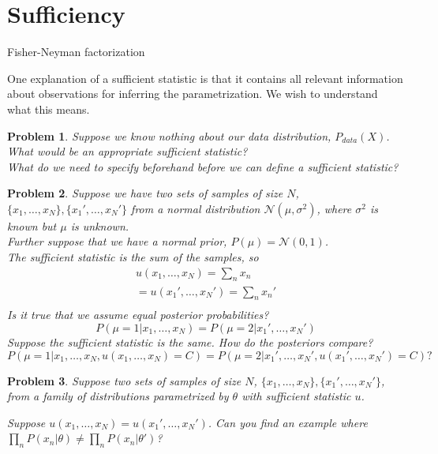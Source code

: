 \documentclass[a4paper]{article}
\newtheorem{problem}{Problem}[section]
\begin{document}
\section{Sufficiency}

Fisher-Neyman factorization

One explanation of a sufficient statistic is that it contains all relevant information about observations for inferring the parametrization.  We wish to understand what this means.

\begin{problem}
Suppose we know nothing about our data distribution, $P_{data}(X)$.  What would be an appropriate sufficient statistic?  \\
What do we need to specify beforehand before we can define a sufficient statistic?  
\end{problem}

\begin{problem}
  Suppose we have two sets of samples of size $N$, $\{x_1,\ldots,x_N\},\{x_1',\ldots,x_N'\}$ from a normal distribution $\mathcal{N}( \mu, \sigma^2 )$, where $\sigma^2$ is known but $\mu$ is unknown.  \\
  Further suppose that we have a normal prior, $P(\mu) = \mathcal{N}(0,1)$.  \\
  The sufficient statistic is the sum of the samples, so 
\begin{equation}
  \begin{split}
    u(x_1,\ldots,x_N) = \sum_n x_n \\
    = u(x_1',\ldots,x_N') = \sum_n x_n' \\
  \end{split}
  \label{}
\end{equation}
Is it true that we assume equal posterior probabilities?
\begin{equation}
  P( \mu = 1 \vert x_1,\ldots,x_N ) = P( \mu = 2 \vert x_1', \ldots, x_N')
  \label{}
\end{equation}
Suppose the sufficient statistic is the same.  How do the posteriors compare?
\begin{equation}
  P( \mu = 1 \vert x_1,\ldots,x_N, u(x_1,\ldots,x_N) = C ) = P( \mu = 2 \vert x_1',\ldots,x_N', u(x_1',\ldots,x_N') = C ) ?
  \label{}
\end{equation}

\end{problem}

\begin{problem}
Suppose two sets of samples of size $N$, $\{x_1,\ldots,x_N\},\{x_1',\ldots,x_N'\}$, from a family of distributions parametrized by $\theta$ with sufficient statistic $u$.

Suppose $u(x_1,\ldots,x_N) = u(x_1',\ldots,x_N')$.  Can you find an example where $ \prod_n P(x_n \vert \theta) \neq \prod_n P(x_n \vert \theta') $?
\end{problem}
\end{document}
